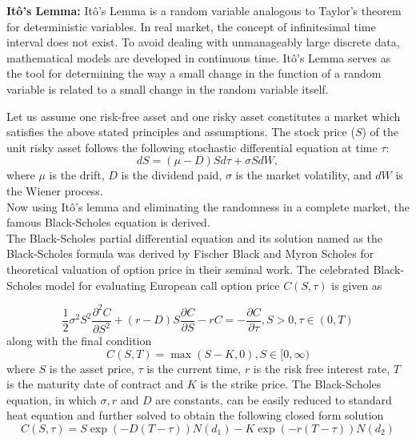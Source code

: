 \documentclass[12pt, a4paper]{report}
\begin{document}
\textbf{Itô’s Lemma:} Itô’s Lemma is a random variable analogous to Taylor’s theorem for deterministic variables. In real market, the concept of infinitesimal time interval does not exist. To avoid dealing with unmanageably large discrete data, mathematical models are developed in continuous time. Itô’s Lemma serves as the tool for determining the way a small change in the function of a random variable is related to a small change in the random variable itself.

Let us assume one risk-free asset and one risky asset constitutes a market which satisfies the above stated principles and assumptions. The stock price ($S$) of the unit risky asset follows the following stochastic differential equation at time $\tau$:
\begin{equation}
dS = (\mu - D) S d\tau + \sigma S dW,
\end{equation}
where $\mu$ is the drift, $D$ is the dividend paid, $\sigma$ is the market volatility, and $dW$ is the Wiener process. \\

Now using Itô’s lemma and eliminating the randomness in a complete market, the famous Black-Scholes equation is derived. \\

The Black-Scholes partial differential equation and its solution named as the Black-Scholes formula was derived by Fischer Black and Myron Scholes for theoretical valuation of option price in their seminal work. The celebrated Black-Scholes model for 
evaluating European call option price $C(S, \tau)$ is given as 

\begin{equation}
\frac{1}{2} \sigma^{2} S^{2} \frac{\partial^{2} C}{\partial S^{2}}+(r-D) S \frac{\partial C}{\partial S}-r C=-\frac{\partial C}{\partial \tau}, S>0, \tau \in(0, T)
\end{equation}
along with the final condition 
\begin{equation}
C(S, T)=\max (S-K, 0), S \in[0, \infty)
\end{equation}
where $S$ is the asset price, $\tau$ is the current time, $r$ is the risk free interest rate, $T$ is the  maturity date of contract and $K$ is the strike price. The Black-Scholes equation, in which  $\sigma, r$ and $D$ are constants, can be easily reduced to standard heat equation and further  solved to obtain the following closed form solution \\
\begin{equation}
C(S, \tau)=S \exp (-D(T-\tau)) N\left(d_{1}\right)-K \exp (-r(T-\tau)) N\left(d_{2}\right)
\end{equation}
\clearpage
\end{document}
